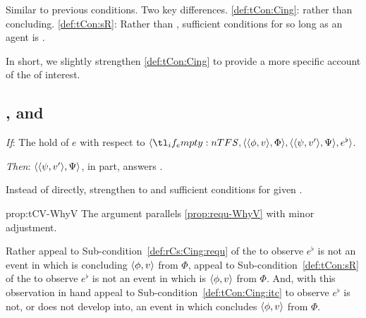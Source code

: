 \begin{note}
  \noindent%
  Similar to previous conditions.
  Two key differences.
  \ref{def:tCon:Cing}: \tCV{} rather than concluding.
  \ref{def:tCon:sR}: Rather than \requ{}, sufficient conditions for \requ{} so long as an agent is \tCV{}.

  In short, we slightly strengthen \ref{def:tCon:Cing} to provide a more specific account of the  of interest.
\end{note}

\subsection{, \qWhyV{} and \issueConstraint{}}
\label{sec:tccon2-qwhyv-}

\begin{note}
  \begin{proposition}
    \label{prop:tCV-WhyV}

    \begin{itenum}
    \item[\emph{If}:]
      The  hold of \(e\) with respect to \(\langle \vAgent{}, \pvp{\phi}{v}{\Phi}, \pvp{\psi}{v'}{\Psi}, e^{\flat} \rangle\).
    \item[\emph{Then}:]
      \(\langle \langle \psi, v' \rangle, \Psi \rangle\), in part, answers \qWhyV{}.
    \end{itenum}
    \vspace{-\baselineskip}
  \end{proposition}

  Instead of \requ{} directly, strengthen to \tCV{} and sufficient conditions for \requ{} given \tCV{}.

  \begin{argument}{prop:tCV-WhyV}
    The argument parallels \autoref{prop:requ-WhyV} with  minor adjustment.

    Rather appeal to Sub-condition~\ref{def:rCs:Cing:requ} of the \rCon{} to observe \(e^{\flat}\) is not an event in which \vAgent{} is concluding \(\langle \phi, v \rangle\) from \(\Phi\), appeal to Sub-condition~\ref{def:tCon:sR} of the \tCon{} to observe \(e^{\flat}\) is not an event in which \vAgent{} is \tCV{} \(\langle \phi, v \rangle\) from \(\Phi\).
    And, with this observation in hand appeal to Sub-condition~\ref{def:tCon:Cing:itc} to observe \(e^{\flat}\) is not, or does not develop into, an event in which \vAgent{} concludes \(\langle \phi, v \rangle\) from \(\Phi\).
  \end{argument}


\end{note}
